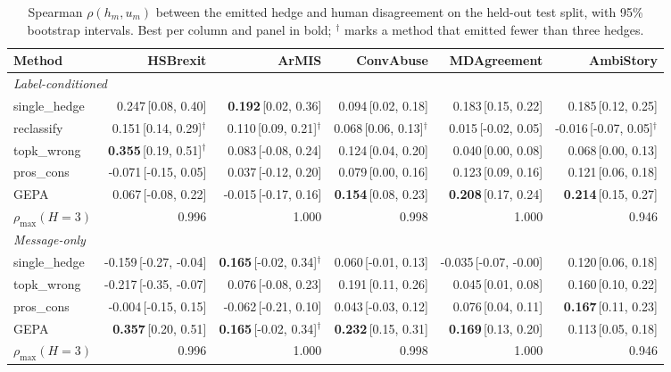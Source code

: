 \begin{table}[t]
\centering
\small
\begin{tabular}{lrrrrr}
\hline
Method & HSBrexit & ArMIS & ConvAbuse & MDAgreement & AmbiStory \\
\hline
\multicolumn{6}{l}{\emph{Label-conditioned}} \\
single\_hedge & 0.247{\scriptsize\,[0.08, 0.40]} & \textbf{0.192}{\scriptsize\,[0.02, 0.36]} & 0.094{\scriptsize\,[0.02, 0.18]} & 0.183{\scriptsize\,[0.15, 0.22]} & 0.185{\scriptsize\,[0.12, 0.25]} \\
reclassify & 0.151{\scriptsize\,[0.14, 0.29]}$^\dagger$ & 0.110{\scriptsize\,[0.09, 0.21]}$^\dagger$ & 0.068{\scriptsize\,[0.06, 0.13]}$^\dagger$ & 0.015{\scriptsize\,[-0.02, 0.05]} & -0.016{\scriptsize\,[-0.07, 0.05]}$^\dagger$ \\
topk\_wrong & \textbf{0.355}{\scriptsize\,[0.19, 0.51]}$^\dagger$ & 0.083{\scriptsize\,[-0.08, 0.24]} & 0.124{\scriptsize\,[0.04, 0.20]} & 0.040{\scriptsize\,[0.00, 0.08]} & 0.068{\scriptsize\,[0.00, 0.13]} \\
pros\_cons & -0.071{\scriptsize\,[-0.15, 0.05]} & 0.037{\scriptsize\,[-0.12, 0.20]} & 0.079{\scriptsize\,[0.00, 0.16]} & 0.123{\scriptsize\,[0.09, 0.16]} & 0.121{\scriptsize\,[0.06, 0.18]} \\
GEPA & 0.067{\scriptsize\,[-0.08, 0.22]} & -0.015{\scriptsize\,[-0.17, 0.16]} & \textbf{0.154}{\scriptsize\,[0.08, 0.23]} & \textbf{0.208}{\scriptsize\,[0.17, 0.24]} & \textbf{0.214}{\scriptsize\,[0.15, 0.27]} \\
$\rho_{\max}(H{=}3)$ & 0.996 & 1.000 & 0.998 & 1.000 & 0.946 \\
\hline
\multicolumn{6}{l}{\emph{Message-only}} \\
single\_hedge & -0.159{\scriptsize\,[-0.27, -0.04]} & \textbf{0.165}{\scriptsize\,[-0.02, 0.34]}$^\dagger$ & 0.060{\scriptsize\,[-0.01, 0.13]} & -0.035{\scriptsize\,[-0.07, -0.00]} & 0.120{\scriptsize\,[0.06, 0.18]} \\
topk\_wrong & -0.217{\scriptsize\,[-0.35, -0.07]} & 0.076{\scriptsize\,[-0.08, 0.23]} & 0.191{\scriptsize\,[0.11, 0.26]} & 0.045{\scriptsize\,[0.01, 0.08]} & 0.160{\scriptsize\,[0.10, 0.22]} \\
pros\_cons & -0.004{\scriptsize\,[-0.15, 0.15]} & -0.062{\scriptsize\,[-0.21, 0.10]} & 0.043{\scriptsize\,[-0.03, 0.12]} & 0.076{\scriptsize\,[0.04, 0.11]} & \textbf{0.167}{\scriptsize\,[0.11, 0.23]} \\
GEPA & \textbf{0.357}{\scriptsize\,[0.20, 0.51]} & \textbf{0.165}{\scriptsize\,[-0.02, 0.34]}$^\dagger$ & \textbf{0.232}{\scriptsize\,[0.15, 0.31]} & \textbf{0.169}{\scriptsize\,[0.13, 0.20]} & 0.113{\scriptsize\,[0.05, 0.18]} \\
$\rho_{\max}(H{=}3)$ & 0.996 & 1.000 & 0.998 & 1.000 & 0.946 \\
\hline
\end{tabular}
\caption{Spearman $\rho(h_m,u_m)$ between the emitted hedge and human disagreement on the held-out test split, with 95\% bootstrap intervals. Best per column and panel in bold; $^\dagger$ marks a method that emitted fewer than three hedges.}
\label{tab:main}
\end{table}
